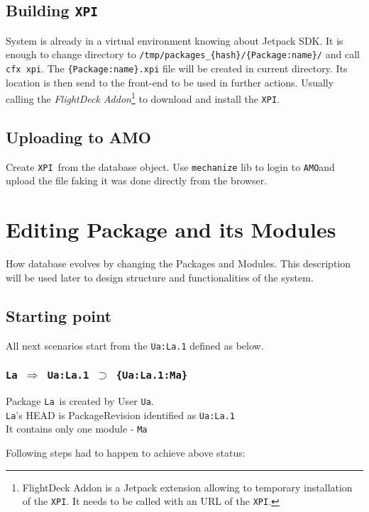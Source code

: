 \documentclass[10pt]{article}
\def\Ua{{\tt Ua}}
\def\La{{\tt La}}
\def\Ma{{\tt Ma}}
\def\xpi{{\tt XPI}}
\def\amo{{\tt AMO}}
\def\headsto{${\Longrightarrow}$ }
\def\hto{\headsto}
\def\eq{${\supset}$ }
\begin{document}
	\subsection{Building \xpi}
	
		System is already in a virtual environment knowing about Jetpack SDK. It is enough to change 
		directory to {\tt /tmp/packages\_\{hash\}/\{Package:name\}/} and call {\tt cfx xpi}. The 
		{\tt \{Package:name\}.xpi} file will be created in current directory. Its location is then send
		to the front-end to be used in further actions. Usually calling the {\em FlightDeck Addon}\footnote{
		FlightDeck Addon is a Jetpack extension allowing to temporary installation of the \xpi. It 
		needs to be called with an URL of the \xpi.} to download and install the \xpi.
	
	\subsection{Uploading to AMO}
	
		Create \xpi\ from the database object. Use {\tt mechanize} lib to login to \amo and upload the 
		file faking it was done directly from the browser.
							
\section{Editing Package and its Modules}

	How database evolves by changing the Packages and Modules. This description will be used later to design 
	structure and functionalities of the system.

	\subsection{Starting point}
		\noindent All next scenarios start from the {\tt Ua:La.1} defined as below.
		\subsubsection*{{\tt La \hto  Ua:La.1 \eq \{Ua:La.1:Ma\}}}
			Package \La\ is created by User \Ua.\\
			\La's HEAD is PackageRevision identified as {\tt Ua:La.1}\\
			It contains only one module - \Ma
			
			\noindent Following steps had to happen to achieve above status:
\end{document}
